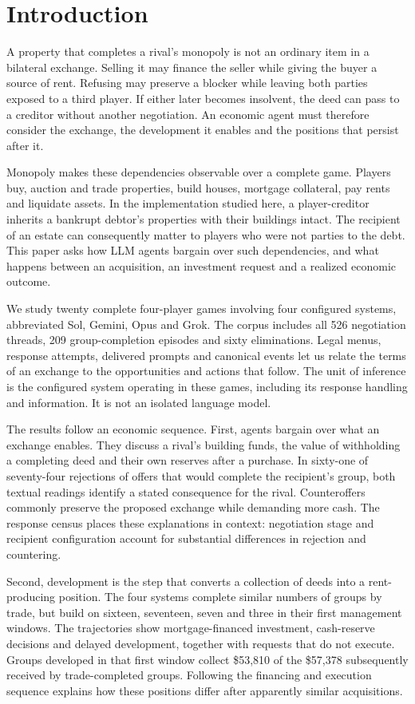 \section{Introduction}

A property that completes a rival's monopoly is not an ordinary item in a bilateral exchange. Selling it may finance the seller while giving the buyer a source of rent. Refusing may preserve a blocker while leaving both parties exposed to a third player. If either later becomes insolvent, the deed can pass to a creditor without another negotiation. An economic agent must therefore consider the exchange, the development it enables and the positions that persist after it.

Monopoly makes these dependencies observable over a complete game. Players buy, auction and trade properties, build houses, mortgage collateral, pay rents and liquidate assets. In the implementation studied here, a player-creditor inherits a bankrupt debtor's properties with their buildings intact. The recipient of an estate can consequently matter to players who were not parties to the debt. This paper asks how LLM agents bargain over such dependencies, and what happens between an acquisition, an investment request and a realized economic outcome.

We study twenty complete four-player games involving four configured systems, abbreviated Sol, Gemini, Opus and Grok. The corpus includes all 526 negotiation threads, 209 group-completion episodes and sixty eliminations. Legal menus, response attempts, delivered prompts and canonical events let us relate the terms of an exchange to the opportunities and actions that follow. The unit of inference is the configured system operating in these games, including its response handling and information. It is not an isolated language model.

The results follow an economic sequence. First, agents bargain over what an exchange enables. They discuss a rival's building funds, the value of withholding a completing deed and their own reserves after a purchase. In sixty-one of seventy-four rejections of offers that would complete the recipient's group, both textual readings identify a stated consequence for the rival. Counteroffers commonly preserve the proposed exchange while demanding more cash. The response census places these explanations in context: negotiation stage and recipient configuration account for substantial differences in rejection and countering.

Second, development is the step that converts a collection of deeds into a rent-producing position. The four systems complete similar numbers of groups by trade, but build on sixteen, seventeen, seven and three in their first management windows. The trajectories show mortgage-financed investment, cash-reserve decisions and delayed development, together with requests that do not execute. Groups developed in that first window collect \$53,810 of the \$57,378 subsequently received by trade-completed groups. Following the financing and execution sequence explains how these positions differ after apparently similar acquisitions.


